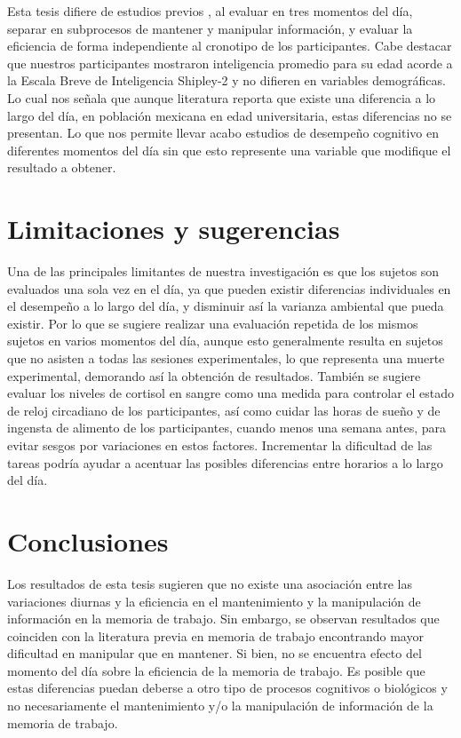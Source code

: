 \documentclass[12pt,letterpaper,final]{article}
\let\cite\cite %
\begin{document}
Esta tesis difiere de estudios previos \cite{Baddeley1970,Schmidt2015}, al evaluar en tres momentos del día,  separar en subprocesos de mantener y manipular información, y evaluar la eficiencia de forma independiente al cronotipo de los participantes. Cabe destacar que nuestros participantes mostraron inteligencia promedio para su edad acorde a la Escala Breve de Inteligencia Shipley-2 \cite{Shipley2014} y no difieren en variables demográficas. Lo cual nos señala que aunque literatura reporta que existe una diferencia a lo largo del día, en población mexicana en edad universitaria, estas diferencias no se presentan. Lo que nos permite llevar acabo estudios de desempeño cognitivo en diferentes momentos del día sin que esto represente una variable que modifique el resultado a obtener. 

\section{Limitaciones y sugerencias}
Una de las principales limitantes de nuestra investigación es que los sujetos son evaluados una sola vez en el día, ya que pueden existir diferencias individuales en el desempeño a lo largo del día, y disminuir así la varianza ambiental que pueda existir. Por lo que se sugiere realizar una evaluación repetida de los mismos sujetos en varios momentos del día, aunque esto generalmente resulta en sujetos que no asisten a todas las sesiones experimentales, lo que representa una muerte experimental, demorando así la obtención de resultados. También se sugiere evaluar los niveles de cortisol en sangre como una medida para controlar el estado de reloj circadiano de los participantes, así como cuidar las horas de sueño y de ingensta de alimento de los participantes, cuando menos una semana antes, para evitar sesgos por variaciones en estos factores. Incrementar la dificultad de las tareas podría ayudar a acentuar las posibles  diferencias entre horarios a lo largo del día.
 
\section{Conclusiones}

Los resultados de esta tesis sugieren que no existe una asociación entre las variaciones diurnas y la eficiencia en el mantenimiento y la manipulación de información en la memoria de trabajo. Sin embargo, se observan resultados que coinciden con la literatura previa en memoria de trabajo encontrando mayor dificultad en manipular que en mantener. Si bien, no se encuentra efecto del momento del día sobre la eficiencia de la memoria de trabajo. Es posible que estas diferencias puedan deberse a otro tipo de procesos cognitivos o biológicos y no necesariamente el mantenimiento y/o la manipulación de información de la memoria de trabajo.   




\renewcommand{\baselinestretch}{1}



\end{document}
